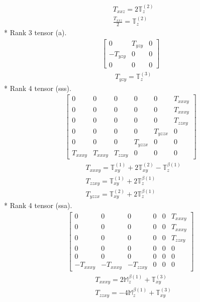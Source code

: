 \documentclass[fleqn,8pt,landscape]{jsarticle}
\begin{document}
\begin{align*}
& T_{xxz} = 2 \mathbb{T}_{z}^{(2)} \\
& \frac{T_{xxz}}{2} = \mathbb{T}_{z}^{(2)}
\end{align*}
* Rank 3 tensor (a).
\begin{align*}
\begin{bmatrix} 0 & T_{yzy} & 0 \\ - T_{yzy} & 0 & 0 \\ 0 & 0 & 0 \end{bmatrix}
\end{align*}
\begin{align*}
& T_{yzy} = \mathbb{T}_{z}^{(3)}
\end{align*}
* Rank 4 tensor (sss).
\begin{align*}
\begin{bmatrix} 0 & 0 & 0 & 0 & 0 & T_{xxxy} \\ 0 & 0 & 0 & 0 & 0 & T_{xxxy} \\ 0 & 0 & 0 & 0 & 0 & T_{zzxy} \\ 0 & 0 & 0 & 0 & T_{yzzx} & 0 \\ 0 & 0 & 0 & T_{yzzx} & 0 & 0 \\ T_{xxxy} & T_{xxxy} & T_{zzxy} & 0 & 0 & 0 \end{bmatrix}
\end{align*}
\begin{align*}
& T_{xxxy} = \mathbb{T}_{xy}^{(1)} + 2 \mathbb{T}_{xy}^{(2)} - \mathbb{T}_{z}^{\beta(1)} \\
& T_{zzxy} = \mathbb{T}_{xy}^{(1)} + 2 \mathbb{T}_{z}^{\beta(1)} \\
& T_{yzzx} = \mathbb{T}_{xy}^{(2)} + 2 \mathbb{T}_{z}^{\beta(1)}
\end{align*}
* Rank 4 tensor (ssa).
\begin{align*}
\begin{bmatrix} 0 & 0 & 0 & 0 & 0 & T_{xxxy} \\ 0 & 0 & 0 & 0 & 0 & T_{xxxy} \\ 0 & 0 & 0 & 0 & 0 & T_{zzxy} \\ 0 & 0 & 0 & 0 & 0 & 0 \\ 0 & 0 & 0 & 0 & 0 & 0 \\ - T_{xxxy} & - T_{xxxy} & - T_{zzxy} & 0 & 0 & 0 \end{bmatrix}
\end{align*}
\begin{align*}
& T_{xxxy} = 2 \mathbb{M}_{z}^{\beta(1)} + \mathbb{T}_{xy}^{(3)} \\
& T_{zzxy} = - 4 \mathbb{M}_{z}^{\beta(1)} + \mathbb{T}_{xy}^{(3)}
\end{align*}
\end{document}
